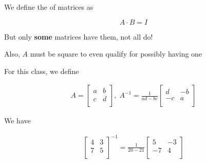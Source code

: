 \documentclass[../../Main.tex]{subfiles}
\begin{document}
\begin{definition}
    We define the  of matrices as

    $$ A \cdot B = I $$

    But only \textbf{some} matrices have them, not all do!

    Also, $A$ must be square to even qualify for possibly having one

    For this class, we define

    \begin{align*}
        A =
        \begin{bmatrix}
            a & b \\
            c & d \\
        \end{bmatrix}
        ,
        \;
        A^{-1} =
        \frac{1}{ad - bc}
        \begin{bmatrix}
            d & -b \\
            -c & a \\
        \end{bmatrix}
    \end{align*}
\end{definition}

\begin{example}
    We have
    
    \begin{align*}
        \begin{bmatrix}
            4 & 3 \\
            7 & 5 \\
        \end{bmatrix}^{-1}
        =
        \frac{1}{20 - 21}
        \begin{bmatrix}
            5 & -3 \\
            -7 & 4 \\
        \end{bmatrix}
    \end{align*}

\end{example}


\end{document}
